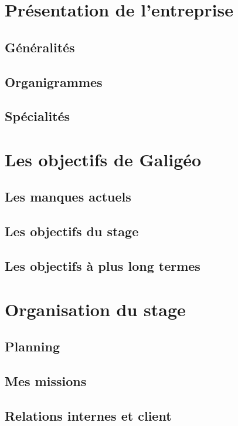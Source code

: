 
\section{Présentation de l'entreprise}

\subsection{Généralités}
\subsection{Organigrammes}
\subsection{Spécialités}

\section{Les objectifs de Galigéo}

\subsection{Les manques actuels}
\subsection{Les objectifs du stage}
\subsection{Les objectifs à plus long termes}

\section{Organisation du stage}

\subsection{Planning}
\subsection{Mes missions}
\subsection{Relations internes et client}